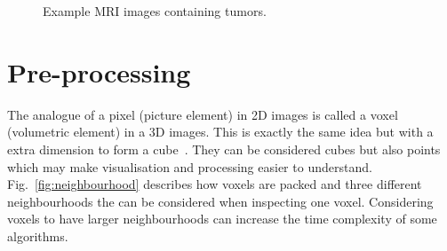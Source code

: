 \documentclass[journal]{IEEEtran}
\begin{document}
\begin{figure}
	\centering
\caption{Example MRI images containing tumors.}
\label{fig:ex}
\end{figure}











\section{Pre-processing}
\label{sec:pre}

The analogue of a pixel (picture element) in 2D images is called a voxel (volumetric element) in a 3D images.
This is exactly the same idea but with a extra dimension to form a cube~\cite{lohmann1998volumetric}.
They can be considered cubes but also points which may make visualisation and processing easier to understand.
Fig.~\ref{fig:neighbourhood} describes how voxels are packed and three different neighbourhoods the can be considered when inspecting one voxel. 
Considering voxels to have larger neighbourhoods can increase the time complexity of some algorithms.
\end{document}
